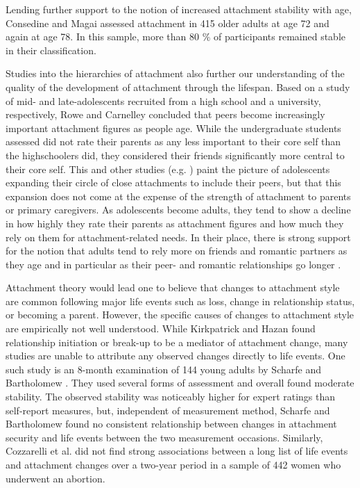 \documentclass[12pt]{report}
\begin{document}
Lending further support to the notion of increased attachment stability with age, Consedine and Magai assessed attachment in 415 older adults at age 72 and again at age 78. In this sample, more than 80 \% of participants remained stable in their classification.

Studies into the hierarchies of attachment also further our understanding of the quality of the development of attachment through the lifespan.
Based on a study of mid- and late-adolescents recruited from a high school and a university, respectively, Rowe and Carnelley \citeyear{Rowe2005} concluded that peers become increasingly important attachment figures as people age. While the undergraduate students assessed did not rate their parents as any less important to their core self than the highschoolers did, they considered their friends significantly more central to their core self.
This and other studies (e.g. ) paint the picture of adolescents expanding their circle of close attachments to include their peers, but that this expansion does not come at the expense of the strength of attachment to parents or primary caregivers.
As adolescents become adults, they tend to show a decline in how highly they rate their parents as attachment figures and how much they rely on them for attachment-related needs. In their place, there is strong support for the notion that adults tend to rely more on friends and romantic partners as they age and in particular as their peer- and romantic relationships go longer \cite{Tancredy2006,Doherty2004,Fraley1997}.

Attachment theory would lead one to believe that changes to attachment style are common following major life events such as loss, change in relationship status, or becoming a parent.
However, the specific causes of changes to attachment style are empirically not well understood.
While Kirkpatrick and Hazan \citeyear{Kirkpatrick1994} found relationship initiation or break-up to be a mediator of attachment change, many studies are unable to attribute any observed changes directly to life events.
One such study is an 8-month examination of 144 young adults by Scharfe and Bartholomew \citeyear{Scharfe1994}.
They used several forms of assessment and overall found moderate stability. The observed stability was noticeably higher for expert ratings than self-report measures, but, independent of measurement method, Scharfe and Bartholomew found no consistent relationship between changes in attachment security and life events between the two measurement occasions.
Similarly, Cozzarelli et al. \citeyear{Cozzarelli2003} did not find strong associations between a long list of life events and attachment changes over a two-year period in a sample of 442 women who underwent an abortion.
\end{document}
